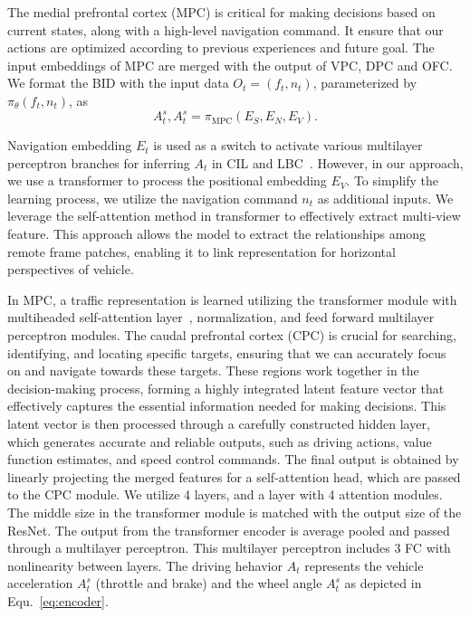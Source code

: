 The medial prefrontal cortex (MPC) is critical for making decisions based on current states, along with a high-level navigation command\cite{passingham2012neurobiology}.
It ensure that our actions are optimized according to previous experiences and future goal.
The input embeddings of MPC are merged with the output of VPC, DPC and OFC.
We format the BID with the input data $O_t=(f_t, n_t)$, parameterized by $ \pi_{\theta}(f_t, n_t) $, as
\begin{equation}\label{eq:encoder}
	A_t^s, A_t^s = \pi_\text{MPC}(E_S, E_N, E_V).
\end{equation}


Navigation embedding $E_{t}$ is used as a switch to activate various multilayer perceptron branches for inferring $A_{t}$ in CIL \cite{Codevilla:2018} and LBC~\cite{Codevilla:2019}. 
However, in our approach, we use a transformer to process the positional embedding $ E_V $.
To simplify the learning process, we utilize the navigation command $n_{t}$ as additional inputs.
%
We leverage the self-attention method in transformer to effectively extract multi-view feature\cite{Vaswani:2017}.
This approach allows the model to extract the relationships among remote frame patches, enabling it to link representation for horizontal perspectives of vehicle.


In MPC, a traffic representation is learned utilizing the transformer module with multiheaded self-attention layer~\cite{Vaswani:2017}, normalization, and feed forward multilayer perceptron modules. 
The caudal prefrontal cortex (CPC) is crucial for searching, identifying, and locating specific targets, ensuring that we can accurately focus on and navigate towards these targets\cite{lawler1987role}. 
These regions work together in the decision-making process, forming a highly integrated latent feature vector that effectively captures the essential information needed for making decisions\cite{wardak2004deficit}. 
This latent vector is then processed through a carefully constructed hidden layer, which generates accurate and reliable outputs, such as driving actions, value function estimates, and speed control commands.
The final output is obtained by linearly projecting the merged features for a self-attention head, which are passed to the CPC module.
We utilize 4 layers, and a layer with 4 attention modules. 
The middle size in the transformer module is matched with the output size of the ResNet.
%
The output from the transformer encoder is average pooled and passed through a multilayer perceptron.
This multilayer perceptron includes 3 FC with nonlinearity between layers.
The driving hehavior $A_t$ represents the vehicle acceleration $A_t^s$ (throttle and brake) and the wheel angle $A_t^s$ as depicted in Equ.~\ref{eq:encoder}. 






